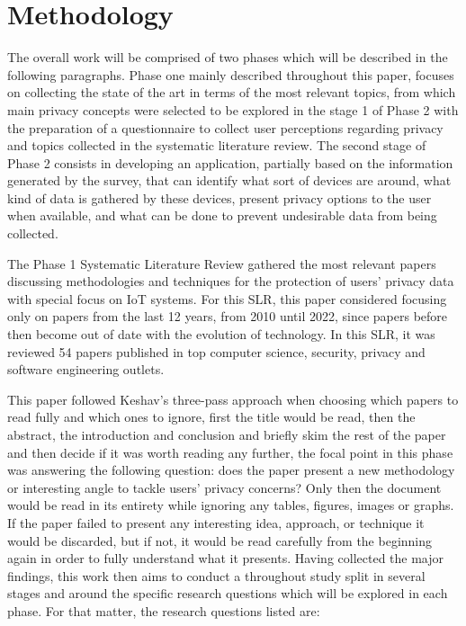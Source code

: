 %
%

\section{Methodology}

The overall work will be comprised of two phases which will be described
in the following paragraphs. Phase one mainly described throughout this
paper, focuses on collecting the state of the art in terms of the most relevant
topics, from which main privacy concepts were selected to be explored in
the stage 1 of Phase 2 with the preparation of a questionnaire to collect
user perceptions regarding privacy and topics collected in the systematic
literature review. The second stage of Phase 2 consists in developing an
application, partially based on the information generated by the survey,
that can identify what sort of devices are around, what kind of data is
gathered by these devices, present privacy options to the user when available,
and what can be done to prevent undesirable data from being collected.
\par
The Phase 1 Systematic Literature Review gathered the most relevant papers
discussing methodologies and techniques for the protection of users' privacy
data with special focus on IoT systems. For this SLR, this paper considered
focusing only on papers from the last 12 years, from 2010 until 2022, since
papers before then become out of date with the evolution of technology.
In this SLR, it was reviewed 54 papers published in top computer science,
security, privacy and software engineering outlets.

This paper followed Keshav's three-pass approach \cite{KeshavHow} when choosing
which papers to read fully and which ones to ignore, first the title would
be read, then the abstract, the introduction and conclusion and briefly
skim the rest of the paper and then decide if it was worth reading any further,
the focal point in this phase was answering the following question: does
the paper present a new methodology or interesting angle to tackle users'
privacy concerns? Only then the document would be read in its entirety while
ignoring any tables, figures, images or graphs. If the paper failed to present
any interesting idea, approach, or technique it would be discarded, but
if not, it would be read carefully from the beginning again in order to
fully understand what it presents. Having collected the major findings,
this work then aims to conduct a throughout study split in several stages
and around the specific research questions which will be explored in each
phase. For that matter, the research questions listed are:

